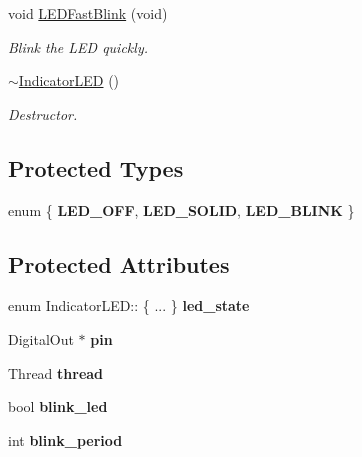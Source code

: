 \begin{DoxyCompactItemize}
\mbox{\label{classIndicatorLED_ac566d7708a4b46cd1abe853f320defb0}} 
void \hyperlink{classIndicatorLED_ac566d7708a4b46cd1abe853f320defb0}{L\+E\+D\+Fast\+Blink} (void)
\begin{DoxyCompactList}\small\item\em Blink the L\+ED quickly. \end{DoxyCompactList}\item 
\mbox{\label{classIndicatorLED_ac97893513aa6527e43e86adcd58b2b2d}} 
\hyperlink{classIndicatorLED_ac97893513aa6527e43e86adcd58b2b2d}{$\sim$\+Indicator\+L\+ED} ()
\begin{DoxyCompactList}\small\item\em Destructor. \end{DoxyCompactList}\end{DoxyCompactItemize}
\subsection*{Protected Types}
\begin{DoxyCompactItemize}
\item 
\mbox{\label{classIndicatorLED_a9fd9aa6dc16304ee02868ec3e5bb21ee}} 
enum \{ {\bfseries L\+E\+D\+\_\+\+O\+FF}, 
{\bfseries L\+E\+D\+\_\+\+S\+O\+L\+ID}, 
{\bfseries L\+E\+D\+\_\+\+B\+L\+I\+NK}
 \}
\end{DoxyCompactItemize}
\subsection*{Protected Attributes}
\begin{DoxyCompactItemize}
\item 
\mbox{\label{classIndicatorLED_a83ecf46edc633a135fb0221edd68987a}} 
enum Indicator\+L\+E\+D\+:: \{ ... \}  {\bfseries led\+\_\+state}
\item 
\mbox{\label{classIndicatorLED_a3a81835df63916bf2412f1f4d976062f}} 
Digital\+Out $\ast$ {\bfseries pin}
\item 
\mbox{\label{classIndicatorLED_ae369c8ca69f2adf6d4477cb08f733f3a}} 
Thread {\bfseries thread}
\item 
\mbox{\label{classIndicatorLED_a11d9a1d0f8545efeeea73e4f7daed1f5}} 
bool {\bfseries blink\+\_\+led}
\item 
\mbox{\label{classIndicatorLED_a79c454d6f8120fa4895d47b223befc1e}} 
int {\bfseries blink\+\_\+period}
\end{DoxyCompactItemize}


